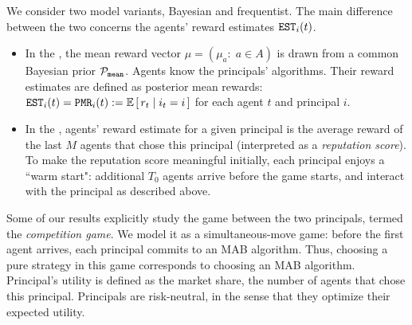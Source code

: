 
We consider two model variants, Bayesian and frequentist. The main difference between the two concerns the agents' reward estimates $\mathtt{EST}_i(t)$.

\begin{itemize}
\item In the \emph{\TheoryModel}, the mean reward vector $\mu = (\mu_a:\; a\in A)$ is drawn from a common Bayesian prior $\mathcal{P}_\mathtt{mean}$. Agents know the principals' algorithms. Their reward estimates are defined as posterior mean rewards:
        $\est_i(t) = \PMR_i(t) := \E\sbr{ r_t\mid i_t = i }$
    for each agent $t$ and principal $i$.

\item In the \emph{\ExptsModel}, agents' reward estimate for a given principal is the average reward of the last $M$ agents that chose this principal (interpreted as a \emph{reputation score}). To make the reputation score meaningful initially, each principal enjoys a ``warm start": additional $T_0$ agents arrive before the game starts, and interact with the principal as described above.

\end{itemize}

Some of our results explicitly study the game between the two principals, termed the \emph{competition game}. We model it as a simultaneous-move game: before the first agent arrives, each principal commits to an MAB algorithm. Thus, choosing a pure strategy in this game corresponds to choosing an MAB algorithm. Principal's utility is defined as the market share, \ie the number of agents that chose this principal. Principals are risk-neutral, in the sense that they optimize their expected utility.

